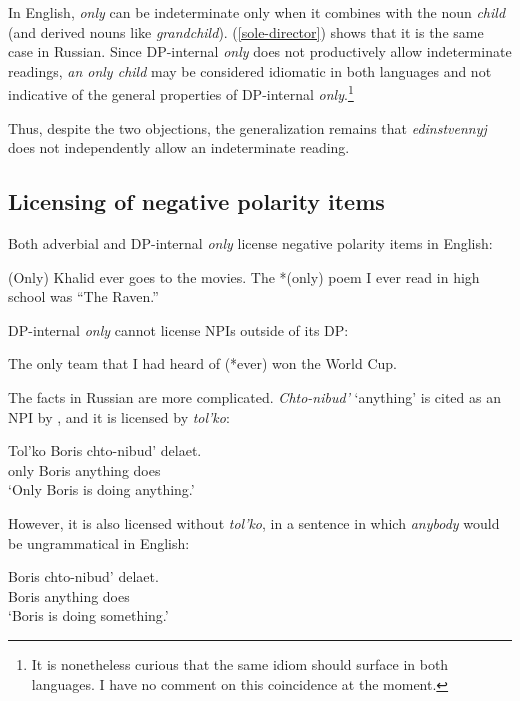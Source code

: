 \documentclass{article}
\begin{document}
In English, \textit{only} can be indeterminate only when it combines with the noun \textit{child} (and derived nouns like \textit{grandchild}). (\ref{sole-director}) shows that it is the same case in Russian. Since DP-internal \textit{only} does not productively allow indeterminate readings, \textit{an only child} may be considered idiomatic in both languages and not indicative of the general properties of DP-internal \textit{only}.\footnote{It is nonetheless curious that the same idiom should surface in both languages. I have no comment on this coincidence at the moment.}

Thus, despite the two objections, the generalization remains that \textit{edinstvennyj} does not independently allow an indeterminate reading.

\subsection{Licensing of negative polarity items}
Both adverbial and DP-internal \textit{only} license negative polarity items in English:

\begin{exe}
	\ex *(Only) Khalid ever goes to the movies.
	\ex The *(only) poem I ever read in high school was ``The Raven.''
\end{exe}

DP-internal \textit{only} cannot license NPIs outside of its DP:

\begin{exe}
	\ex The only team that I had heard of (*ever) won the World Cup.
\end{exe}

The facts in Russian are more complicated. \textit{Chto-nibud'} `anything' is cited as an NPI by \citet{russneg}, and it is licensed by \textit{tol'ko}:

\begin{exe}
	\ex \gll Tol'ko Boris chto-nibud' delaet.\\
	only Boris anything does\\
	\glt `Only Boris is doing anything.'
\end{exe}

However, it is also licensed without \textit{tol'ko}, in a sentence in which \textit{anybody} would be ungrammatical in English:

\begin{exe}
	\ex \label{nibud-no-polarity} \gll Boris chto-nibud' delaet.\\
	Boris anything does\\
	\glt `Boris is doing something.' %
\end{exe}
\end{document}
